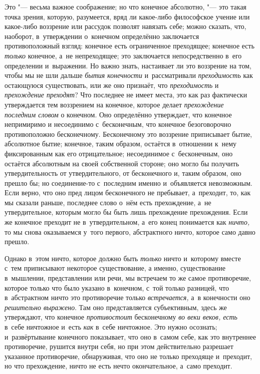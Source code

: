 Это "--- весьма важное соображение; но что конечное абсолютно, "--- это такая
точка зрения, которую, разумеется, вряд ли какое-либо философское учение
или какое-либо воззрение или рассудок позволят навязать себе; можно
сказать, что, наоборот, в~утверждении о~конечном определённо заключается
противоположный взгляд: конечное есть ограниченное преходящее; конечное
есть {\em только} конечное, а~не непреходящее; это
заключается непосредственно в~его определении и~выражении. Но важно знать,
настаивает ли это воззрение на том, чтобы мы не шли дальше
{\em бытия конечности} и~рассматривали
{\em преходимость} как остающуюся существовать, или же
оно признаёт, что {\em преходимость} и
{\em прехождение преходят}? Что последнее не имеет
места, это как раз фактически утверждается тем воззрением на конечное,
которое делает {\em прехождение последним словом} о
конечном. Оно определённо утверждает, что конечное непримиримо и
несоединимо с~бесконечным, что конечное безоговорочно противоположно
бесконечному. Бесконечному это воззрение приписывает бытие, абсолютное
бытие; конечное, таким образом, остаётся в~отношении к~нему фиксированным
как его отрицательное; несоединимое с~бесконечным, оно остаётся абсолютным
на своей собственной стороне; оно могло бы получить утвердительность от
утвердительного, от бесконечного и, таким образом, оно прешло бы; но
соединение-то с~последним именно и~объявляется невозможным. Если верно, что
оно пред лицом бесконечного не пребывает, а~преходит, то, как мы сказали
раньше, последнее слово о~нём есть прехождение, а~не утвердительное,
которым могло бы быть лишь прехождение прехождения. Если же конечное
преходит не в~утвердительном, а~его конец понимается как
{\em ничто,} то мы снова оказываемся у~того первого,
абстрактного ничто, которое само давно прешло.

Однако в~этом ничто, которое должно быть {\em только}
ничто и~которому вместе с~тем приписывают некоторое существование, а
именно, существование в~мышлении, представлении или речи, мы встречаем то
же самое противоречие, которое только что было указано в~конечном, с~той
только разницей, что в~абстрактном ничто это противоречие только
{\em встречается,} а~в конечности оно
{\em решительно выражено}. Там оно представляется
субъективным, здесь же утверждают, что конечное
{\em противостоит} бесконечному
{\em во веки веков, есть} в~себе ничтожное и~есть {\em как} в~себе ничтожное.
Это нужно осознать; и~развёртывание конечного показывает, что оно в~самом себе,
как это внутреннее противоречие, рушится внутри себя, но при этом
действительно разрешает указанное противоречие, обнаруживая, что оно не
только преходяще и~преходит, но что прехождение, ничто не есть нечто
окончательное, а~само преходит.

